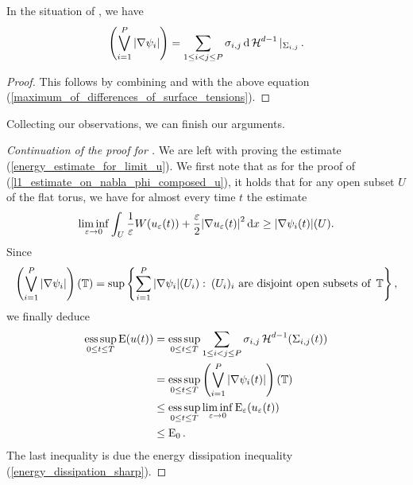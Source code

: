 \begin{proposition}
	\label{supremum_of_abs_nabla_psi_i_is_energy}
	In the situation of  , we have
	\begin{equation*}
		\left(
			\bigvee_{ i = 1 }^{ P }
			\abs{ \nabla \psi_{ i } }
		\right)
		=
		\sum_{ 1 \leq i < j \leq P }
		 \sigma_{ i , j }
		 \dd{ \operatorname{\mathcal{H}}^{ d - 1 } |_{ \Sigma_{ i , j } } }.
	\end{equation*}
\end{proposition}

\begin{proof}
	This follows by combining  and  with the above equation (\ref{maximum_of_differences_of_surface_tensions}).
\end{proof}

Collecting our observations, we can finish our arguments.

\begin{proof}[Continuation of the proof for ]
	We are left with proving the estimate (\ref{energy_estimate_for_limit_u}). We first note that as for the proof of (\ref{l1_estimate_on_nabla_phi_composed_u}), it holds that for any open subset $ U $ of the flat torus, we have for almost every time $ t $ the estimate
	\begin{equation*}
		\liminf_{ \varepsilon \to 0 } 
			\int_{ U }
				\frac{ 1 }{ \varepsilon }
				W ( u_{ \varepsilon } ( t )  )
				+
				\frac{ \varepsilon }{ 2 }
				\abs{ \nabla u_{ \varepsilon } ( t ) }^{ 2 }
			\dd{ x }
		\geq
		\abs{ \nabla \psi_{ i } ( t ) } ( U ).
	\end{equation*}
	Since
	\begin{equation*}
		\left(
		\bigvee_{ i = 1 }^{ P }
			\abs{ \nabla \psi_{ i } } 
		\right) 
		( \operatorname{\mathbb{T}} )
		=
		\sup \left\{
			\sum_{ i = 1 }^{ P }
				\abs{ \nabla \psi_{ i } } ( U_{ i } )
			\, \colon \,
			( U_{ i } )_{ i } \text{ are disjoint open subsets of } \operatorname{\mathbb{T}}
		\right\},
	\end{equation*}
	we finally deduce
	\begin{align*}
		\operatorname*{ess\,sup}_{ 0 \leq t \leq T }
			\operatorname{E} ( u ( t ) )
		& =
		\operatorname*{ess\,sup}_{ 0 \leq t \leq T }
			\sum_{ 1 \leq i < j \leq P }
				\sigma_{ i , j }
				\operatorname{\mathcal{H}}^{ d - 1 } ( \Sigma_{ i , j } ( t ) )
		\\
		& = \operatorname*{ess\,sup}_{ 0 \leq t \leq T }
		\left(
			\bigvee_{ i = 1 }^{ P }
				\abs{ \nabla \psi_{ i } ( t ) }
		\right) ( \operatorname{\mathbb{T}} )
		\\
		& \leq
		\operatorname*{ess\,sup}_{ 0 \leq t \leq T }
			\liminf_{ \varepsilon \to 0 }
				\operatorname{E}_{ \varepsilon } ( u_{ \varepsilon } ( t ) )
		\\
		& \leq
		\operatorname{E}_{ 0 }.
	\end{align*}
	The last inequality is due the energy dissipation inequality (\ref{energy_dissipation_sharp}).
\end{proof}

